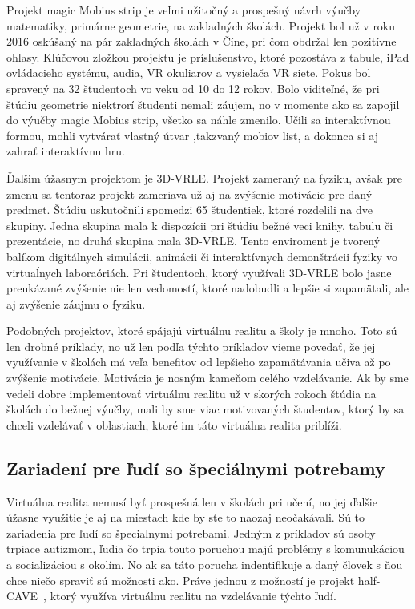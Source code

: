 \documentclass[10pt,twoside,slovak,a4paper]{article}
\begin{document}
Projekt magic Mobius strip je veľmi užitočný a prospešný návrh výučby matematiky, primárne geometrie, na zakladných školách. Projekt bol už v roku 2016 oskúšaný na pár zakladných školách v Číne, pri čom obdržal len pozitívne ohlasy. Klúčovou zložkou projektu je príslušenstvo, ktoré pozostáva z tabule, iPad ovládacieho systému, audia, VR okuliarov a vysielača VR siete. Pokus bol spravený na 32 študentoch vo veku od 10 do 12 rokov. Bolo viditeľné, že pri štúdiu geometrie niektrorí študenti nemali záujem, no v momente ako sa zapojil do výučby magic Mobius strip, všetko sa náhle zmenilo. Učili sa interaktívnou formou, mohli vytvárať vlastný útvar ,takzvaný mobiov list, a dokonca si aj zahrať interaktívnu hru.~\cite{Math}

Ďalšim úžasnym projektom je 3D-VRLE. Projekt zameraný na fyziku, avšak pre zmenu sa tentoraz projekt zameriava už aj na zvýšenie motivácie pre daný predmet. Štúdiu uskutočnili spomedzi 65 študentiek, ktoré rozdelili na dve skupiny. Jedna skupina mala k dispozícii pri štúdiu bežné veci knihy, tabulu či prezentácie, no druhá skupina mala 3D-VRLE. Tento enviroment je tvorený balíkom digitálnych simulácii, animácii či interaktívnych demonštrácii fyziky vo virtuaĺnych laboraóriách. Pri študentoch, ktorý využívali 3D-VRLE bolo jasne preukázané zvýšenie nie len vedomostí, ktoré nadobudli a lepšie si zapamätali, ale aj zvýšenie záujmu o fyziku.~\cite{Physics} 

Podobných projektov, ktoré spájajú virtuálnu realitu a školy je mnoho. Toto sú len drobné príklady, no už len podľa týchto príkladov vieme povedať, že jej využívanie v školách má veľa benefitov od lepšieho zapamätávania učiva až po zvýšenie motivácie. Motivácia je nosným kameňom celého vzdelávanie. Ak by sme vedeli dobre implementovať virtuálnu realitu už v skorých rokoch štúdia na školách do bežnej výučby, mali by sme viac motivovaných študentov, ktorý by sa chceli vzdelávať v oblastiach, ktoré im táto virtuálna realita priblíži.  


\subsection{Zariadení pre ľudí so špeciálnymi potrebamy} \label{školy:zariadenia}
Virtuálna realita nemusí byť prospešná len v školách pri učení, no jej ďalšie úžasne využitie je aj na miestach kde by ste to naozaj neočakávali. Sú to zariadenia pre ľudí so špecialnymi potrebami. Jedným z príkladov sú osoby trpiace autizmom, ľudia čo trpia touto poruchou majú problémy s komunukáciou a socializáciou s okolím. No ak sa táto porucha indentifikuje a daný človek s ňou chce niečo spraviť sú možnosti ako. Práve jednou z možností je projekt half-CAVE~\cite{Autism}, ktorý využíva virtuálnu realitu na vzdelávanie týchto ľudí.
\end{document}
